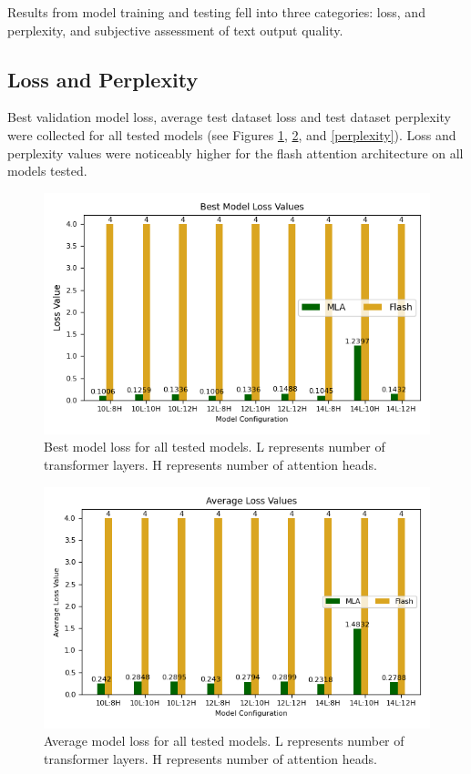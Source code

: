 Results from model training and testing fell into three categories: loss, and perplexity, and subjective assessment of text output quality.

\subsection{Loss and Perplexity}
Best validation model loss, average test dataset loss and test dataset perplexity were collected for all tested models (see Figures \ref{best_loss}, \ref{avg_loss}, and \ref{perplexity}).
Loss and perplexity values were noticeably higher for the flash attention architecture on all models tested.

\begin{figure}[H]
    \centering
    \includegraphics[width=\linewidth]{sections/images/best_loss.png}
    \caption{Best model loss for all tested models. L represents number of transformer layers. H represents number of attention heads.}
    \label{best_loss}
\end{figure}

\begin{figure}[H]
    \centering
    \includegraphics[width=\linewidth]{sections/images/avg_loss.png}
    \caption{Average model loss for all tested models. L represents number of transformer layers. H represents number of attention heads.}
    \label{avg_loss}
\end{figure}

